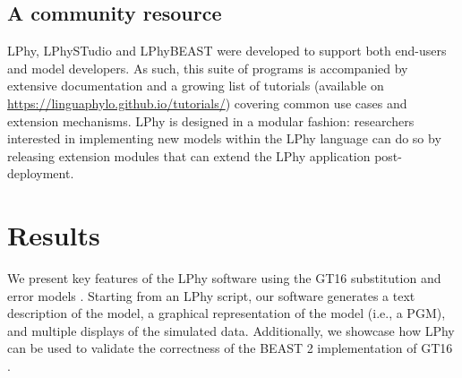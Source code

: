 \documentclass[10pt,letterpaper,table]{article}
\theoremstyle{definition}
\begin{document}
\subsection{A community resource}
LPhy, LPhySTudio and LPhyBEAST were developed to support both end-users and model developers.
As such, this suite of programs is accompanied by extensive documentation and a growing list of tutorials (available on \url{https://linguaphylo.github.io/tutorials/}) covering common use cases and extension mechanisms.
LPhy is designed in a modular fashion: researchers interested in implementing new models within the LPhy language can do so by releasing extension modules that can extend the LPhy application post-deployment.




\section{Results}
We present key features of the LPhy software using the GT16 substitution and error models \cite{kozlov2022cellphy}. 
Starting from an LPhy script, our software generates a text description of the model, a graphical representation of the model (i.e., a PGM), and multiple displays of the simulated data. 
Additionally, we showcase how LPhy can be used to validate the correctness of the BEAST 2 implementation of GT16 \cite{chen2022accounting}. 
\end{document}
